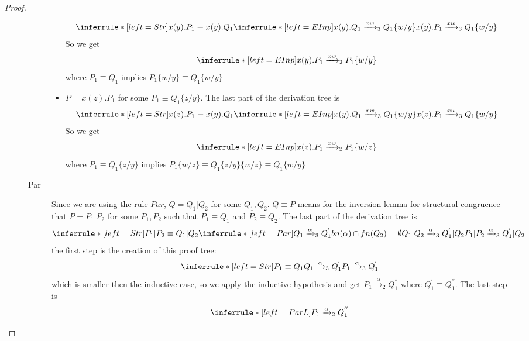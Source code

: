 \begin{theorem}
\begin{proof}
\begin{description}
\begin{description}
\begin{itemize}
			\[
			  \inferrule* [left=Str]{
			      x(y).P_{1}\equiv x(y).Q_{1}
			    \\
			      \inferrule* [left=EInp]{
			      }{
				x(y).Q_{1}\xrightarrow{xw}_{3}Q_{1}\{w/y\}
			      }
			  }{
			    x(y).P_{1}\xrightarrow{xw}_{3}Q_{1}\{w/y\}
			  }
			\]
			So we get 
			\[
			  \inferrule* [left=EInp]{
			  }{
			    x(y).P_{1}\xrightarrow{xw}_{2}P_{1}\{w/y\}
			  }
			\]
			where $P_{1}\equiv Q_{1}$ implies $P_{1}\{w/y\}\equiv Q_{1}\{w/y\}$
		      \item
			$P=x(z).P_{1}$ for some $P_{1}\equiv Q_{1}\{z/y\}$. The last part of the derivation tree is 
			\[
			  \inferrule* [left=Str]{
			      x(z).P_{1}\equiv x(y).Q_{1}
			    \\
			      \inferrule* [left=EInp]{
			      }{
				x(y).Q_{1}\xrightarrow{xw}_{3}Q_{1}\{w/y\}
			      }
			  }{
			    x(z).P_{1}\xrightarrow{xw}_{3}Q_{1}\{w/y\}
			  }
			\]
			So we get 
			\[
			  \inferrule* [left=EInp]{
			  }{
			    x(z).P_{1}\xrightarrow{xw}_{2}P_{1}\{w/z\}
			  }
			\]
			where $P_{1}\equiv Q_{1}\{z/y\}$ implies $P_{1}\{w/z\}\equiv Q_{1}\{z/y\}\{w/z\}\equiv Q_{1}\{w/y\}$
		    \end{itemize}
		  \item[Par]
		    Since we are using the rule $Par$, $Q=Q_{1}|Q_{2}$ for some $Q_{1},Q_{2}$. $Q\equiv P$ means for the inversion lemma for structural congruence that $P=P_{1}|P_{2}$ for some $P_{1},P_{2}$ such that $P_{1}\equiv Q_{1}$ and $P_{2}\equiv Q_{2}$. The last part of the derivation tree is 
		    \[
		      \inferrule* [left=Str]{
			  P_{1}|P_{2}\equiv Q_{1}|Q_{2}
			\\
			  \inferrule* [left=Par]{
			      Q_{1}\xrightarrow{\alpha}_{3}Q_{1}^{'}
			    \\
			      bn(\alpha)\cap fn(Q_{2})=\emptyset
			  }{
			    Q_{1}|Q_{2}\xrightarrow{\alpha}_{3}Q_{1}^{'}|Q_{2}
			  }
		      }{
			P_{1}|P_{2}\xrightarrow{\alpha}_{3}Q_{1}^{'}|Q_{2}
		      }
		    \]
		    the first step is the creation of this proof tree:
		    \[
			  \inferrule* [left=Str]{
			      P_{1}\equiv Q_{1}
			    \\
			      Q_{1}\xrightarrow{\alpha}_{3}Q_{1}^{'}
			  }{
			    P_{1}\xrightarrow{\alpha}_{3}Q_{1}^{'}
			  }
		    \]
		    which is smaller then the inductive case, so we apply the inductive hypothesis and get $P_{1}\xrightarrow{\alpha}_{2}Q_{1}^{''}$ where $Q_{1}^{'}\equiv Q_{1}^{''}$. The last step is 
		    \[
		      \inferrule* [left=ParL]{
			  P_{1}\xrightarrow{\alpha}_{2}Q_{1}^{''}
			\\
}\]
\end{description}
\end{description}
\end{proof}
\end{theorem}
